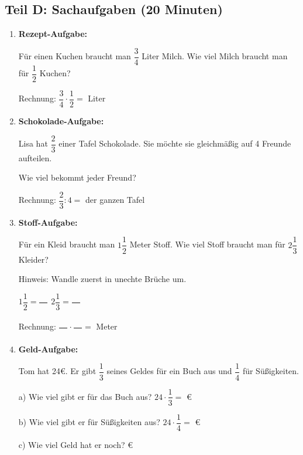 \subsection*{Teil D: Sachaufgaben (20 Minuten)}

\begin{enumerate}[label=\arabic*.]
    \item \textbf{Rezept-Aufgabe:}

    Für einen Kuchen braucht man $\dfrac{3}{4}$ Liter Milch. Wie viel Milch braucht man für $\dfrac{1}{2}$ Kuchen?

    Rechnung: $\dfrac{3}{4} \cdot \dfrac{1}{2} = $ \underline{\hspace{3cm}} Liter

    \vspace{0.5cm}

    \item \textbf{Schokolade-Aufgabe:}

    Lisa hat $\dfrac{2}{3}$ einer Tafel Schokolade. Sie möchte sie gleichmäßig auf 4 Freunde aufteilen.

    Wie viel bekommt jeder Freund?

    Rechnung: $\dfrac{2}{3} : 4 = $ \underline{\hspace{3cm}} der ganzen Tafel

    \vspace{0.5cm}

    \item \textbf{Stoff-Aufgabe:}

    Für ein Kleid braucht man $1\dfrac{1}{2}$ Meter Stoff. Wie viel Stoff braucht man für $2\dfrac{1}{3}$ Kleider?

    Hinweis: Wandle zuerst in unechte Brüche um.

    $1\dfrac{1}{2} = \dfrac{\phantom{00}}{\phantom{00}}$ \quad $2\dfrac{1}{3} = \dfrac{\phantom{00}}{\phantom{00}}$

    Rechnung: $\dfrac{\phantom{00}}{\phantom{00}} \cdot \dfrac{\phantom{00}}{\phantom{00}} = $ \underline{\hspace{3cm}} Meter

    \vspace{0.5cm}

    \item \textbf{Geld-Aufgabe:}

    Tom hat 24€. Er gibt $\dfrac{1}{3}$ seines Geldes für ein Buch aus und $\dfrac{1}{4}$ für Süßigkeiten.

    a) Wie viel gibt er für das Buch aus? $24 \cdot \dfrac{1}{3} = $ \underline{\hspace{2cm}} €

    b) Wie viel gibt er für Süßigkeiten aus? $24 \cdot \dfrac{1}{4} = $ \underline{\hspace{2cm}} €

    c) Wie viel Geld hat er noch? \underline{\hspace{3cm}} €

\end{enumerate}
